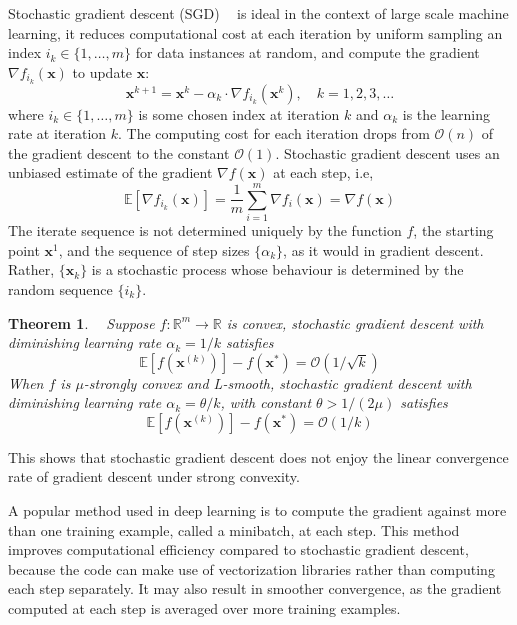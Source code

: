 \documentclass[12pt]{report}
\newtheorem{thm}{Theorem}[section]
\numberwithin{equation}{section}
\begin{document}
Stochastic gradient descent (SGD) \textbf{~\cite{robbins1951stochastic}} is ideal in the context of large scale machine learning, it reduces computational cost at each iteration by uniform sampling an index $i_k \in\{1, \ldots, m\}$ for data instances at random, and compute the gradient $\nabla f_{i_{k}}(\bm{x})$ to update $\bm{x}$:
\begin{equation}\label{eqn:sgd}
\bm{x}^{k+1}=\bm{x}^{k}- \alpha_k \cdot \nabla f_{i_{k}}\left(\bm{x}^{k}\right), \quad k=1,2,3, \ldots
\end{equation}
where $i_{k} \in\{1, \ldots, m\}$ is some chosen index at iteration $k$ and $\alpha_k$ is the learning rate at iteration $k$. The computing cost for each iteration drops from $\mathcal{O}(n)$ of the gradient descent to the constant $\mathcal{O}(1)$. Stochastic gradient descent uses an unbiased estimate of the gradient $\nabla f(\bm{x})$ at each step, i.e,
\begin{equation}\label{eqn:sgd_est}
\mathbb{E}[\nabla f_{i_{k}}(\bm{x})]=\frac{1}{m} \sum_{i=1}^{m} \nabla f_{i}(\bm{x})  = \nabla f(\bm{x})
\end{equation}
The iterate sequence is not determined uniquely by the function $f$, the starting point $\bm{x}^1$, and the sequence of step sizes $\{\alpha_k\}$, as it would in gradient descent. Rather, $\{\bm{x}_k\}$ is a stochastic process whose behaviour is determined by the random sequence $\{i_k\}$.
\begin{thm}
\normalfont \textbf{~\cite{nemirovski2009robust}}
Suppose $f:\mathbb{R}^m\rightarrow\mathbb{R}$ is convex, stochastic gradient descent with diminishing learning rate $\alpha_k = 1/k$ satisfies
\[
\mathbb{E}[f(\bm{x}^{(k)})] - f(\bm{x}^*) = \mathcal{O}(1/\sqrt{k})
\]
When $f$ is $\mu$-strongly convex and L-smooth, stochastic gradient descent with diminishing learning rate $\alpha_k = \theta/k$, with constant $\theta > 1/(2\mu)$ satisfies
\[
\mathbb{E}[f(\bm{x}^{(k)})] - f(\bm{x}^*) = \mathcal{O}(1/k)
\]
\end{thm}
\noindent
This shows that stochastic gradient descent does not enjoy the linear convergence rate of gradient descent under strong convexity.

A popular method used in deep learning is to 
compute the gradient against more than one training example, called a minibatch, at each step. This method improves computational efficiency compared to stochastic gradient descent, because the code can make use of vectorization libraries rather than computing each step separately. It may also result in smoother convergence, as the gradient computed at each step is averaged over more training examples. 
\end{document}
